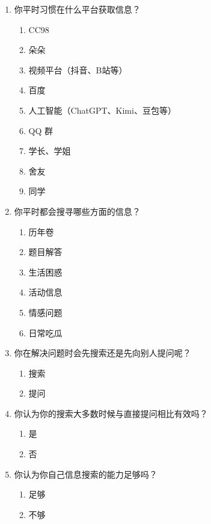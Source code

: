 \begin{enumerate}[leftmargin=*]
    \item 你平时习惯在什么平台获取信息？
      \begin{enumerate}[label=\Alph*., itemsep=0pt]
        \item CC98
        \item 朵朵
        \item 视频平台（抖音、B站等）
        \item 百度
        \item 人工智能（ChatGPT、Kimi、豆包等）
        \item QQ 群
        \item 学长、学姐
        \item 舍友
        \item 同学
      \end{enumerate}

    \item 你平时都会搜寻哪些方面的信息？
      \begin{enumerate}[label=\Alph*., itemsep=0pt]
        \item 历年卷
        \item 题目解答
        \item 生活困惑
        \item 活动信息
        \item 情感问题
        \item 日常吃瓜
      \end{enumerate}

    \item 你在解决问题时会先搜索还是先向别人提问呢？
      \begin{enumerate}[label=\Alph*., itemsep=0pt]
        \item 搜索
        \item 提问
      \end{enumerate}

    \item 你认为你的搜索大多数时候与直接提问相比有效吗？
      \begin{enumerate}[label=\Alph*., itemsep=0pt]
        \item 是
        \item 否
      \end{enumerate}

    \item 你认为你自己信息搜索的能力足够吗？
      \begin{enumerate}[label=\Alph*., itemsep=0pt]
        \item 足够
        \item 不够
      \end{enumerate}


\end{enumerate}
